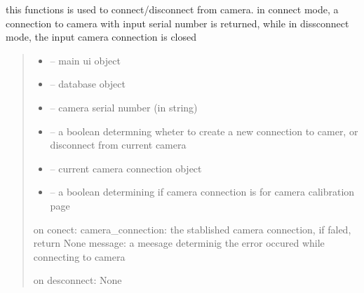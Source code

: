 \documentclass[letterpaper,10pt,english]{sphinxmanual}
\begin{document}
\begin{savenotes}\begin{fulllineitems}
\label{\detokenize{setting/backend/camera_funcs:oxin.backend.camera_funcs.connect_disconnect_camera}}
\pysigstartsignatures
{}
\pysigstopsignatures
\sphinxAtStartPar
this functions is used to connect/disconnect from camera.
in connect mode, a connection to camera with input serial number is returned,
while in dissconnect mode, the input camera connection is closed
\begin{quote}\begin{description}
\begin{itemize}
\item {} 
\sphinxAtStartPar
{} – main ui object

\item {} 
\sphinxAtStartPar
{} – database object

\item {} 
\sphinxAtStartPar
{} – camera serial number (in string)

\item {} 
\sphinxAtStartPar
{} – a boolean determning wheter to create a new connection to camer, or disconnect from current camera

\item {} 
\sphinxAtStartPar
{} – current camera connection object

\item {} 
\sphinxAtStartPar
{} – a boolean determining if camera connection is for camera calibration page

\end{itemize}

\sphinxAtStartPar
on conect:
camera\_connection: the stablished camera connection, if faled, return None
message: a meesage determinig the error occured while connecting to camera

\sphinxAtStartPar
on desconnect: None

\end{description}\end{quote}

\end{fulllineitems}\end{savenotes}
\end{document}

